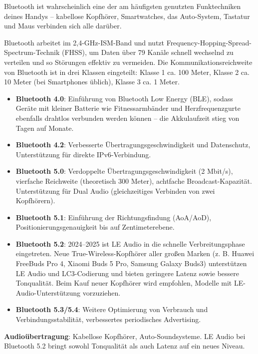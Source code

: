 
Bluetooth ist wahrscheinlich eine der am häufigsten genutzten Funktechniken deines Handys – kabellose Kopfhörer, Smartwatches, das Auto-System, Tastatur und Maus verbinden sich alle darüber.


Bluetooth arbeitet im 2,4-GHz-ISM-Band und nutzt Frequency-Hopping-Spread-Spectrum-Technik (FHSS), um Daten über 79 Kanäle schnell wechselnd zu verteilen und so Störungen effektiv zu vermeiden. Die Kommunikationsreichweite von Bluetooth ist in drei Klassen eingeteilt: Klasse 1 ca. 100 Meter, Klasse 2 ca. 10 Meter (bei Smartphones üblich), Klasse 3 ca. 1 Meter.


\begin{itemize}
  \item \textbf{Bluetooth 4.0}: Einführung von Bluetooth Low Energy (BLE), sodass Geräte mit kleiner Batterie wie Fitnessarmbänder und Herzfrequenzgurte ebenfalls drahtlos verbunden werden können – die Akkulaufzeit stieg von Tagen auf Monate.
  \item \textbf{Bluetooth 4.2}: Verbesserte Übertragungsgeschwindigkeit und Datenschutz, Unterstützung für direkte IPv6-Verbindung.
  \item \textbf{Bluetooth 5.0}: Verdoppelte Übertragungsgeschwindigkeit (2 Mbit/s), vierfache Reichweite (theoretisch 300 Meter), achtfache Broadcast-Kapazität. Unterstützung für Dual Audio (gleichzeitiges Verbinden von zwei Kopfhörern).
  \item \textbf{Bluetooth 5.1}: Einführung der Richtungsfindung (AoA/AoD), Positionierungsgenauigkeit bis auf Zentimeterebene.
  \item \textbf{Bluetooth 5.2}: 2024–2025 ist LE Audio in die schnelle Verbreitungsphase eingetreten. Neue True-Wireless-Kopfhörer aller großen Marken (z. B. Huawei FreeBuds Pro 4, Xiaomi Buds 5 Pro, Samsung Galaxy Buds3) unterstützen LE Audio und LC3-Codierung und bieten geringere Latenz sowie bessere Tonqualität. Beim Kauf neuer Kopfhörer wird empfohlen, Modelle mit LE-Audio-Unterstützung vorzuziehen.
  \item \textbf{Bluetooth 5.3/5.4}: Weitere Optimierung von Verbrauch und Verbindungsstabilität, verbessertes periodisches Advertising.
\end{itemize}

\textbf{Audioübertragung}: Kabellose Kopfhörer, Auto-Soundsysteme. LE Audio bei Bluetooth 5.2 bringt sowohl Tonqualität als auch Latenz auf ein neues Niveau.

